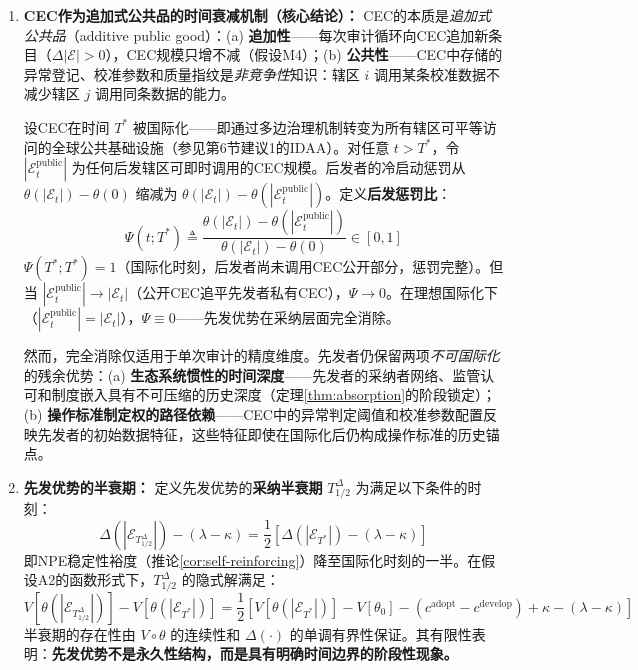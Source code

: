\documentclass[12pt,a4paper]{ctexart}
\theoremstyle{definition}
\theoremstyle{remark}
\begin{document}
\begin{corollary}
\begin{enumerate}[label=(\roman*), itemsep=6pt]
\item \textbf{CEC作为追加式公共品的时间衰减机制（核心结论）：} CEC的本质是\textit{追加式公共品}（additive public good）：(a) \textbf{追加性}——每次审计循环向CEC追加新条目（$\Delta |\mathcal{E}| > 0$），CEC规模只增不减（假设M4）；(b) \textbf{公共性}——CEC中存储的异常登记、校准参数和质量指纹是\textit{非竞争性}知识：辖区 $i$ 调用某条校准数据不减少辖区 $j$ 调用同条数据的能力。

设CEC在时间 $T^*$ 被国际化——即通过多边治理机制转变为所有辖区可平等访问的全球公共基础设施（参见第6节建议1的IDAA）。对任意 $t > T^*$，令 $|\mathcal{E}_t^{\text{public}}|$ 为任何后发辖区可即时调用的CEC规模。后发者的冷启动惩罚从 $\theta(|\mathcal{E}_t|) - \theta(0)$ 缩减为 $\theta(|\mathcal{E}_t|) - \theta(|\mathcal{E}_t^{\text{public}}|)$。定义\textbf{后发惩罚比}：
\begin{equation}
\Psi(t; T^*) \triangleq \frac{\theta(|\mathcal{E}_t|) - \theta(|\mathcal{E}_t^{\text{public}}|)}{\theta(|\mathcal{E}_t|) - \theta(0)} \in [0, 1]
\end{equation}
$\Psi(T^*; T^*) = 1$（国际化时刻，后发者尚未调用CEC公开部分，惩罚完整）。但当 $|\mathcal{E}_t^{\text{public}}| \to |\mathcal{E}_t|$（公开CEC追平先发者私有CEC），$\Psi \to 0$。在理想国际化下（$|\mathcal{E}_t^{\text{public}}| = |\mathcal{E}_t|$），$\Psi \equiv 0$——先发优势在采纳层面完全消除。

然而，完全消除仅适用于单次审计的精度维度。先发者仍保留两项\textit{不可国际化}的残余优势：(a) \textbf{生态系统惯性的时间深度}——先发者的采纳者网络、监管认可和制度嵌入具有不可压缩的历史深度（定理\ref{thm:absorption}的阶段锁定）；(b) \textbf{操作标准制定权的路径依赖}——CEC中的异常判定阈值和校准参数配置反映先发者的初始数据特征，这些特征即使在国际化后仍构成操作标准的历史锚点。

\item \textbf{先发优势的半衰期：} 定义先发优势的\textbf{采纳半衰期} $T_{1/2}^{\Delta}$ 为满足以下条件的时刻：
\begin{equation}
\Delta(|\mathcal{E}_{T_{1/2}^{\Delta}}|) - (\lambda - \kappa) = \frac{1}{2}\left[\Delta(|\mathcal{E}_{T^*}|) - (\lambda - \kappa)\right]
\end{equation}
即NPE稳定性裕度（推论\ref{cor:self-reinforcing}）降至国际化时刻的一半。在假设A2的函数形式下，$T_{1/2}^{\Delta}$ 的隐式解满足：
\begin{equation}
V[\theta(|\mathcal{E}_{T_{1/2}^{\Delta}}|)] - V[\theta(|\mathcal{E}_{T^*}|)] = \frac{1}{2}\left[V[\theta(|\mathcal{E}_{T^*}|)] - V[\theta_0] - (c^{\text{adopt}} - c^{\text{develop}}) + \kappa - (\lambda - \kappa)\right]
\end{equation}
半衰期的存在性由 $V \circ \theta$ 的连续性和 $\Delta(\cdot)$ 的单调有界性保证。其有限性表明：\textbf{先发优势不是永久性结构，而是具有明确时间边界的阶段性现象。}


\end{enumerate}
\end{corollary}
\end{document}
